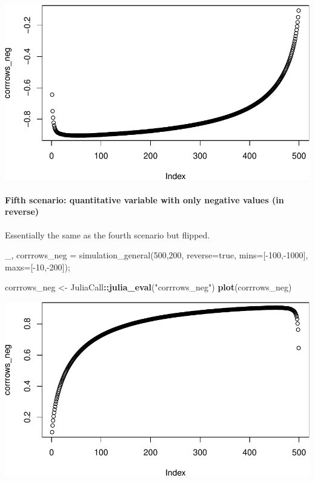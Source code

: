 \documentclass[]{article}
\newenvironment{Shaded}{\begin{snugshade}}{\end{snugshade}}
\newcommand{\FloatTok}[1]{\textcolor[rgb]{0.00,0.00,0.81}{#1}}
\newcommand{\KeywordTok}[1]{\textcolor[rgb]{0.13,0.29,0.53}{\textbf{#1}}}
\newcommand{\NormalTok}[1]{#1}
\newcommand{\OperatorTok}[1]{\textcolor[rgb]{0.81,0.36,0.00}{\textbf{#1}}}
\newcommand{\StringTok}[1]{\textcolor[rgb]{0.31,0.60,0.02}{#1}}
\let\oldparagraph\paragraph
\renewcommand{\paragraph}[1]{\oldparagraph{#1}\mbox{}}
\begin{document}
\includegraphics{./figures/unnamed-chunk-20-1.pdf}

\newpage

\hypertarget{fifth-scenario-quantitative-variable-with-only-negative-values-in-reverse}{%
\paragraph{Fifth scenario: quantitative variable with only negative
values (in
reverse)}\label{fifth-scenario-quantitative-variable-with-only-negative-values-in-reverse}}

Essentially the same as the fourth scenario but flipped.

\begin{Shaded}
\begin{Highlighting}[]
\NormalTok{_, corrrows_neg = simulation_general(}\FloatTok{500}\NormalTok{,}\FloatTok{200}\NormalTok{, reverse=true, mins=[-}\FloatTok{100}\NormalTok{,-}\FloatTok{1000}\NormalTok{], maxs=[-}\FloatTok{10}\NormalTok{,-}\FloatTok{200}\NormalTok{]);}
\end{Highlighting}
\end{Shaded}

\begin{Shaded}
\begin{Highlighting}[]
\NormalTok{corrrows_neg <-}\StringTok{ }\NormalTok{JuliaCall}\OperatorTok{::}\KeywordTok{julia_eval}\NormalTok{(}\StringTok{"corrrows_neg"}\NormalTok{)}
\KeywordTok{plot}\NormalTok{(corrrows_neg)}
\end{Highlighting}
\end{Shaded}

\includegraphics{./figures/unnamed-chunk-22-1.pdf}
\end{document}
